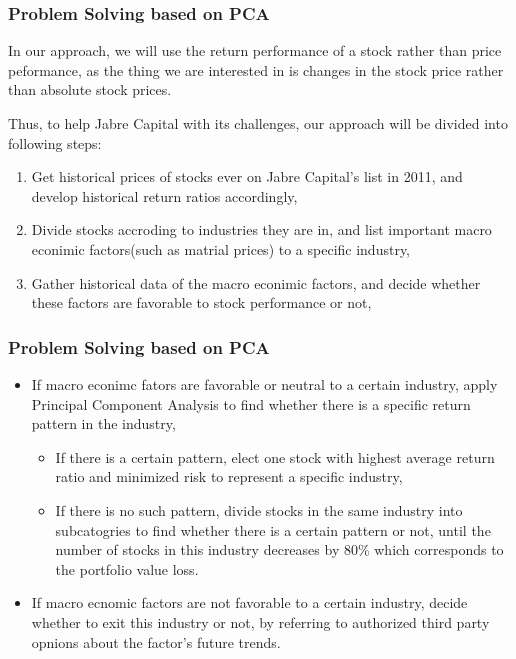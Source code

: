 \documentclass[compress,handout,10pt]{beamer}
\let\olditem\item
\renewcommand{\item}{\setlength{\itemsep}{0.5\baselineskip}\olditem}
\begin{document}
\begin{frame}
    \frametitle{Problem Solving based on PCA}
In our approach, we will use the return performance of a stock rather than price peformance, as the thing we are interested in is changes in the stock price rather than absolute stock prices.

Thus, to help Jabre Capital with its challenges, our approach will be divided into following steps:
\begin{enumerate}
\item Get historical prices of stocks ever on Jabre Capital's list in 2011, and develop historical return ratios accordingly,
\item Divide stocks accroding to industries they are in, and list important macro econimic factors(such as matrial prices) to a specific industry,
\item Gather historical data of the macro econimic factors, and decide whether these factors are favorable to stock performance or not,
\end{enumerate}
\end{frame}

\begin{frame}
    \frametitle{Problem Solving based on PCA}
\begin{itemize}
\item If macro econimc fators are favorable or neutral to a certain industry, apply Principal Component Analysis to find whether there is a specific return pattern in the industry,
	\begin{itemize}
	\item If there is a certain pattern, elect one stock with highest average return ratio and minimized risk to represent a specific industry,
	\item If there is no such pattern, divide stocks in the same industry into subcatogries to find whether there is a certain pattern or not, until the number of stocks in this industry decreases by 80\% which corresponds to the portfolio value loss.
	\end{itemize}
\item If macro ecnomic factors are not favorable to a certain industry, decide whether to exit this industry or not, by referring to authorized third party opnions about the factor's future trends.
\end{itemize} 

\end{frame}
\end{document}
